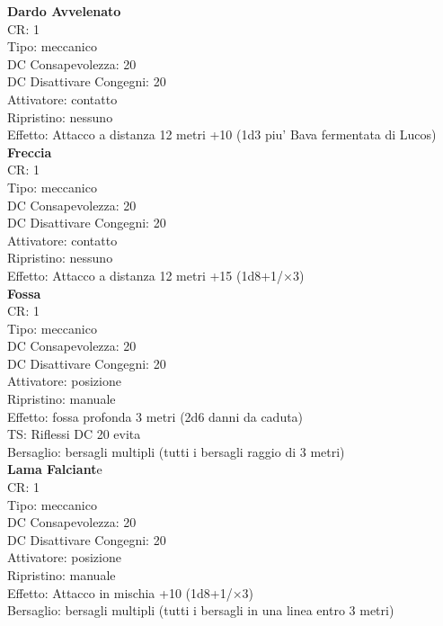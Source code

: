 \documentclass[a4paper,11pt,twoside,openany]{book}
\begin{document}
\begin{multicols}{2}
	
\textbf{Dardo Avvelenato}\\
CR: 1 \\
Tipo: meccanico \\
DC Consapevolezza: 20 \\
DC Disattivare Congegni: 20 \\
Attivatore: contatto \\
Ripristino: nessuno \\
Effetto: Attacco a distanza 12 metri +10 (1d3 piu' Bava fermentata di Lucos)\\

\textbf{Freccia}\\
CR: 1 \\
Tipo: meccanico \\
DC Consapevolezza: 20 \\
DC Disattivare Congegni: 20 \\
Attivatore: contatto \\
Ripristino: nessuno \\
Effetto: Attacco a distanza 12 metri +15 (1d8+1/×3)\\

\textbf{Fossa}\\
CR: 1 \\
Tipo: meccanico \\
DC Consapevolezza: 20 \\
DC Disattivare Congegni: 20 \\
Attivatore: posizione \\
Ripristino: manuale \\
Effetto: fossa profonda 3 metri (2d6 danni da caduta) \\
TS: Riflessi DC 20 evita \\
Bersaglio: bersagli multipli (tutti i bersagli raggio di 3 metri)\\

\textbf{Lama Falciant}e\\
CR: 1 \\
Tipo: meccanico \\
DC Consapevolezza: 20 \\
DC Disattivare Congegni: 20 \\
Attivatore: posizione \\
Ripristino: manuale \\
Effetto: Attacco in mischia +10 (1d8+1/×3) \\
Bersaglio: bersagli multipli (tutti i bersagli in una linea entro 3 metri)\\


\end{multicols}
\end{document}

